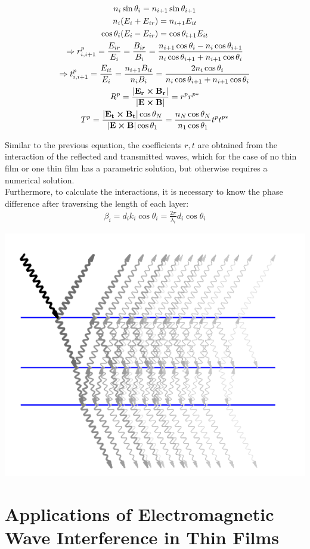 \documentclass{article}
\begin{document}
	\begin{gather*}
		n_i \sin \theta_i= n _{i+1} \sin \theta_{i+1}\\
		n_i(E_i+E_{ir})=n_{i+1}E_{it}\\
		\cos \theta_i(	E_i-E_{ir})=\cos \theta_{i+1} E_{it}\\
		\Rightarrow r^p_{i,i+1}=\frac{E_{ir}}{E_i}=\frac{B_{ir}}{B_i}=\frac{n_{i+1}\cos\theta_i-n_i \cos \theta_{i+1}}{n_i \cos \theta_{i+1}+n_{i+1}\cos \theta_i}\\
		\Rightarrow t^p_{i,i+1}=\frac{E_{it}}{E_i}=\frac{n_{i+1} B_{it}}{n_i B_i}=\frac{2n_i \cos \theta_i}{n_i \cos \theta_{i+1}+n_{i+1}\cos \theta_i}\\
		R^p=\frac{|\mathbf{E_{r}}\cross \mathbf{B_{r}}|}{|\mathbf{E}\cross \mathbf{B}|}=r^p r^{p*}\\
		T^p=\frac{|\mathbf{E_{t}}\cross \mathbf{B_{t}}|\cos \theta_{N}}{|\mathbf{E}\cross \mathbf{B}|\cos \theta_1}=\frac{n_N\cos \theta_N}{n_1\cos \theta_1} t^p t^{p*}
	\end{gather*}
	
	Similar to the previous equation, the coefficients $r,t$ are obtained from the interaction of the reflected and transmitted waves, which for the case of no thin film or one thin film has a parametric solution, but otherwise requires a numerical solution.
	\\
	Furthermore, to calculate the interactions, it is necessary to know the phase difference after traversing the length of each layer:
	\begin{gather*}
		\beta_i=d_ik_i\cos\theta_i=\frac{2\pi}{\lambda_i}d_i\cos\theta_i
	\end{gather*}
	
	\begin{center}
		\includegraphics[height=.45\linewidth]{wAN1K}
	\end{center}
	\newpage	

	
	\section*{Applications of Electromagnetic Wave Interference in Thin Films}
\end{document}

